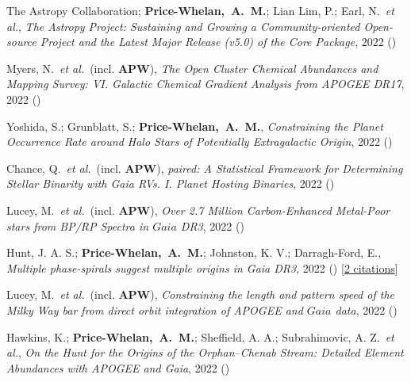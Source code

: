 \item[{\color{deemph}\scriptsize22}]The Astropy Collaboration; \textbf{Price-Whelan,~A.~M.}; Lian Lim, P.; Earl, N.~\textit{et al.}, \textit{The Astropy Project: Sustaining and Growing a Community-oriented Open-source Project and the Latest Major Release (v5.0) of the Core Package}, 2022 ()

\item[{\color{deemph}\scriptsize21}]Myers, N.~\textit{et al.}~(incl. \textbf{APW}), \textit{The Open Cluster Chemical Abundances and Mapping Survey: VI. Galactic Chemical Gradient Analysis from APOGEE DR17}, 2022 ()

\item[{\color{deemph}\scriptsize20}]Yoshida, S.; Grunblatt, S.; \textbf{Price-Whelan,~A.~M.}, \textit{Constraining the Planet Occurrence Rate around Halo Stars of Potentially Extragalactic Origin}, 2022 ()

\item[{\color{deemph}\scriptsize19}]Chance, Q.~\textit{et al.}~(incl. \textbf{APW}), \textit{paired: A Statistical Framework for Determining Stellar Binarity with Gaia RVs. I. Planet Hosting Binaries}, 2022 ()

\item[{\color{deemph}\scriptsize18}]Lucey, M.~\textit{et al.}~(incl. \textbf{APW}), \textit{Over 2.7 Million Carbon-Enhanced Metal-Poor stars from BP/RP Spectra in $Gaia$ DR3}, 2022 ()

\item[{\color{deemph}\scriptsize17}]Hunt, J. A. S.; \textbf{Price-Whelan,~A.~M.}; Johnston, K. V.; Darragh-Ford, E., \textit{Multiple phase-spirals suggest multiple origins in Gaia DR3}, 2022 () [\href{http://adsabs.harvard.edu/abs/2022arXiv220606125H}{2 citations}]

\item[{\color{deemph}\scriptsize16}]Lucey, M.~\textit{et al.}~(incl. \textbf{APW}), \textit{Constraining the length and pattern speed of the Milky Way bar from direct orbit integration of APOGEE and $Gaia$ data}, 2022 ()

\item[{\color{deemph}\scriptsize15}]Hawkins, K.; \textbf{Price-Whelan,~A.~M.}; Sheffield, A. A.; Subrahimovic, A. Z.~\textit{et al.}, \textit{On the Hunt for the Origins of the Orphan--Chenab Stream: Detailed Element Abundances with APOGEE and Gaia}, 2022 ()

